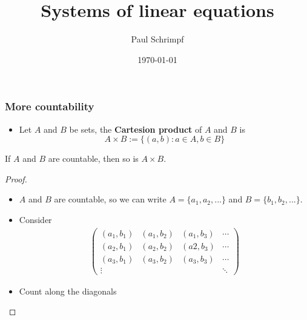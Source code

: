 \documentclass[compress]{beamer}
\title{Systems of linear equations}
\author{Paul Schrimpf}
\institute{UBC \\ Economics 526}
\date{\today}
\begin{document}
\frame{\titlepage}



\begin{frame}
  \frametitle{More countability}
  \begin{itemize}
  \item Let $A$ and $B$ be sets, the \textbf{Cartesion product} of $A$
    and $B$ is
    \[ A \times B := \{(a, b) : a \in A, b \in B\} \]
  \end{itemize}
  \begin{theorem}
    If $A$ and $B$ are countable, then so is $A \times B$.
  \end{theorem}
  \begin{proof}
    \begin{itemize}
    \item $A$ and $B$ are countable, so we can write $A = \{a_1, a_2,
      ...\}$ and $B = \{b_1, b_2, ... \}$.
    \item Consider 
      \begin{align*}
        \begin{pmatrix} 
          (a_1, b_1) & (a_1, b_2) & (a_1, b_3) & \cdots \\
          (a_2, b_1) & (a_2, b_2) & (a2, b_3) & \cdots \\
          (a_3, b_1) & (a_3, b_2) & (a_3, b_3) & \cdots \\
          \vdots &               &           & \ddots
        \end{pmatrix}
      \end{align*}
    \item Count along the diagonals
    \end{itemize}
  \end{proof}  
\end{frame}
\end{document}
